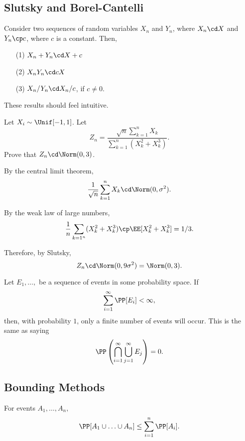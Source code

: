 \subsection{Slutsky and Borel-Cantelli}

\begin{theorem}

Consider two sequences of random variables $X_n$ and $Y_n$, where $X_n\cd X$ and $Y_n\cp c$, where $c$ is a constant. Then,
\begin{enumerate}
    \item [(1)] $X_n + Y_n \cd X + c$\\
    \item [(2)] $X_nY_n\cd cX$ \\ 
    \item [(3)] $X_n/Y_n \cd X_n/c$, if $c\neq 0$.
\end{enumerate}
\end{theorem}

These results should feel intuitive. 

\begin{example}
\exlabel

Let $X_i\sim \Unif[-1,1]$. Let 
\[Z_n = \frac{\sqrt{n}\sum_{k=1}^nX_k}{\sum_{k=1}^n(X_k^2+X_k^3)}.\]
Prove that $Z_n\cd \Norm(0,3)$.
\end{example}

By the central limit theorem, 
\[\frac{1}{\sqrt{n}}\sum_{k=1}^nX_k\cd \Norm(0, \sigma^2).\]

By the weak law of large numbers, 
\[\frac{1}{n}\sum_{k=1^n}(X_k^2 + X_k^3)\cp \EE[X_k^2 + X_k^3] = 1/3.\]

Therefore, by Slutsky, 
\[Z_n\cd \Norm(0, 9\sigma^2) = \Norm(0, 3).\]

\begin{theorem}

Let $E_1, \hdots, $ be a sequence of events in some probability space. If 
\[\sum_{i=1}^{\infty}\PP[E_i] < \infty,\]
then, with probability $1$, only a finite number of events will occur. This is the same as saying 
\[\PP\left(\bigcap_{i=1}^{\infty}\bigcup_{j=1}^{\infty}E_j\right) = 0.\]
\end{theorem}

\subsection{Bounding Methods}

\begin{theorem}

For events $A_1, \hdots, A_n,$
\[\PP[A_1\cup \hdots \cup A_n]\leq \sum_{i=1}^n \PP[A_i].\]
\end{theorem}

